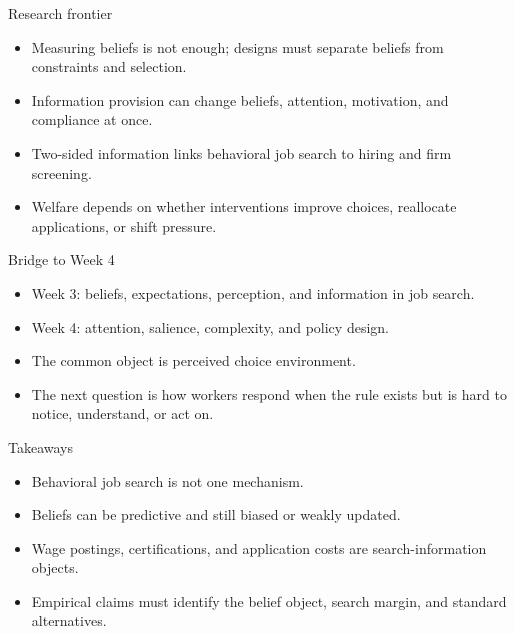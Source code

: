 \documentclass[aspectratio=169,11pt]{beamer}
\begin{document}
\begin{frame}{Research frontier}
\begin{itemize}
    \item Measuring beliefs is not enough; designs must separate beliefs from constraints and selection.
    \item Information provision can change beliefs, attention, motivation, and compliance at once.
    \item Two-sided information links behavioral job search to hiring and firm screening.
    \item Welfare depends on whether interventions improve choices, reallocate applications, or shift pressure.
\end{itemize}
\end{frame}

\begin{frame}{Bridge to Week 4}
\begin{itemize}
    \item Week 3: beliefs, expectations, perception, and information in job search.
    \item Week 4: attention, salience, complexity, and policy design.
    \item The common object is perceived choice environment.
    \item The next question is how workers respond when the rule exists but is hard to notice, understand, or act on.
\end{itemize}
\end{frame}

\begin{frame}{Takeaways}
\begin{itemize}
    \item Behavioral job search is not one mechanism.
    \item Beliefs can be predictive and still biased or weakly updated.
    \item Wage postings, certifications, and application costs are search-information objects.
    \item Empirical claims must identify the belief object, search margin, and standard alternatives.
\end{itemize}
\end{frame}
\end{document}
